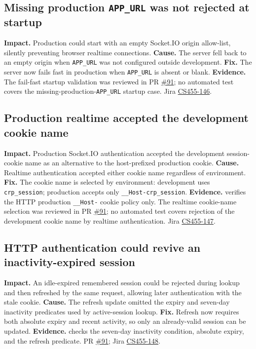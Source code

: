 \documentclass[10pt]{article}
\begin{document}
\subsection{Missing production \texttt{APP\_URL} was not rejected at startup}
\textbf{Impact.} Production could start with an empty Socket.IO origin allow-list, silently preventing browser realtime connections.
\textbf{Cause.} The server fell back to an empty origin when \texttt{APP\_URL} was not configured outside development.
\textbf{Fix.} The server now fails fast in production when \texttt{APP\_URL} is absent or blank.
\textbf{Evidence.} The fail-fast startup validation was reviewed in PR \href{https://github.com/CS455-Carpooling/Campus_Ridepooling_Automation/pull/91}{\#91}; no automated test covers the missing-production-\texttt{APP\_URL} startup case. Jira \href{https://cs455project.atlassian.net/browse/CS455-146}{CS455-146}.
\subsection{Production realtime accepted the development cookie name}
\textbf{Impact.} Production Socket.IO authentication accepted the development session-cookie name as an alternative to the host-prefixed production cookie.
\textbf{Cause.} Realtime authentication accepted either cookie name regardless of environment.
\textbf{Fix.} The cookie name is selected by environment: development uses \texttt{crp\_session}; production accepts only \texttt{\_\_Host-crp\_session}.
\textbf{Evidence.}  verifies the HTTP production \texttt{\_\_Host-} cookie policy only. The realtime cookie-name selection was reviewed in PR \href{https://github.com/CS455-Carpooling/Campus_Ridepooling_Automation/pull/91}{\#91}; no automated test covers rejection of the development cookie name by realtime authentication. Jira \href{https://cs455project.atlassian.net/browse/CS455-147}{CS455-147}.
\subsection{HTTP authentication could revive an inactivity-expired session}
\textbf{Impact.} An idle-expired remembered session could be rejected during lookup and then refreshed by the same request, allowing later authentication with the stale cookie.
\textbf{Cause.} The refresh update omitted the expiry and seven-day inactivity predicates used by active-session lookup.
\textbf{Fix.} Refresh now requires both absolute expiry and recent activity, so only an already-valid session can be updated.
\textbf{Evidence.}  checks the seven-day inactivity condition, absolute expiry, and the refresh predicate. PR \href{https://github.com/CS455-Carpooling/Campus_Ridepooling_Automation/pull/91}{\#91}; Jira \href{https://cs455project.atlassian.net/browse/CS455-148}{CS455-148}.
\end{document}

